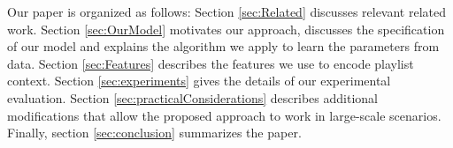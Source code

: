 Our paper is organized as follows: Section \ref{sec:Related} discusses relevant related work. Section \ref{sec:OurModel} motivates our approach, discusses the specification of our model and explains the  algorithm we apply to learn the parameters from data. Section \ref{sec:Features} describes the features we use to encode  playlist context. Section \ref{sec:experiments} gives the details of our experimental evaluation. Section \ref{sec:practicalConsiderations} describes additional modifications that allow the proposed approach to work in large-scale scenarios. Finally, section \ref{sec:conclusion} summarizes the paper.


